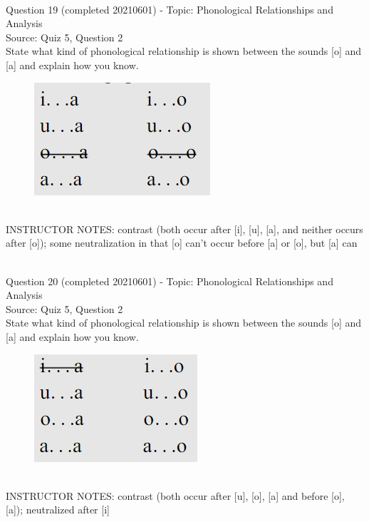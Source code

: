 \documentclass[12pt]{article}
\begin{document}
~\\

{\large Question 19} (completed 20210601) - Topic: Phonological Relationships and Analysis\\
Source: Quiz 5, Question 2\\

State what kind of phonological relationship is shown between the sounds [o] and [a] and explain how you know.\\

\begin{figure}[H]
\includegraphics{../images/peng70ao_a.png}
\end{figure}

~\\
INSTRUCTOR NOTES: contrast (both occur after [i], [u], [a], and neither occurs after [o]); some neutralization in that [o] can't occur before [a] or [o], but [a] can


~\\

{\large Question 20} (completed 20210601) - Topic: Phonological Relationships and Analysis\\
Source: Quiz 5, Question 2\\

State what kind of phonological relationship is shown between the sounds [o] and [a] and explain how you know.\\

\begin{figure}[H]
\includegraphics{../images/peng70ao_b.png}
\end{figure}

~\\
INSTRUCTOR NOTES: contrast (both occur after [u], [o], [a] and before [o], [a]); neutralized after [i]
\end{document}
